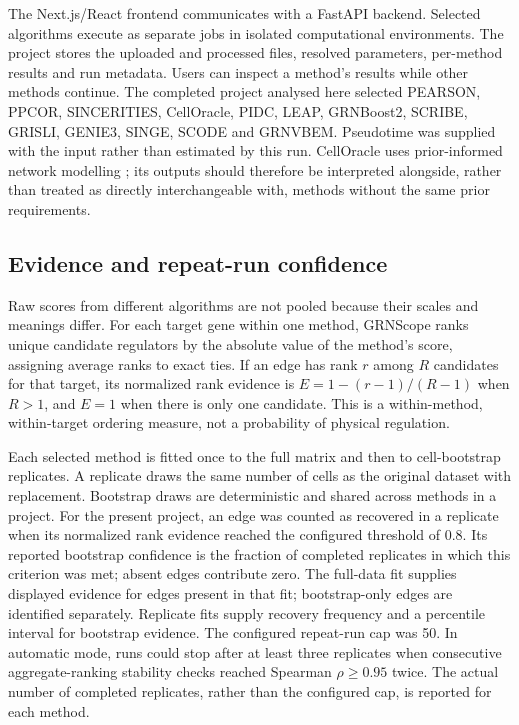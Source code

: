 \documentclass[11pt]{article}
\begin{document}
The Next.js/React frontend communicates with a FastAPI backend. Selected algorithms execute as separate jobs in isolated computational environments. The project stores the uploaded and processed files, resolved parameters, per-method results and run metadata. Users can inspect a method's results while other methods continue. The completed project analysed here selected PEARSON, PPCOR, SINCERITIES, CellOracle, PIDC, LEAP, GRNBoost2, SCRIBE, GRISLI, GENIE3, SINGE, SCODE and GRNVBEM. Pseudotime was supplied with the input rather than estimated by this run. CellOracle uses prior-informed network modelling \cite{kamimoto2023}; its outputs should therefore be interpreted alongside, rather than treated as directly interchangeable with, methods without the same prior requirements.

\subsection{Evidence and repeat-run confidence}

Raw scores from different algorithms are not pooled because their scales and meanings differ. For each target gene within one method, GRNScope ranks unique candidate regulators by the absolute value of the method's score, assigning average ranks to exact ties. If an edge has rank \(r\) among \(R\) candidates for that target, its normalized rank evidence is \(E=1-(r-1)/(R-1)\) when \(R>1\), and \(E=1\) when there is only one candidate. This is a within-method, within-target ordering measure, not a probability of physical regulation.

Each selected method is fitted once to the full matrix and then to cell-bootstrap replicates. A replicate draws the same number of cells as the original dataset with replacement. Bootstrap draws are deterministic and shared across methods in a project. For the present project, an edge was counted as recovered in a replicate when its normalized rank evidence reached the configured threshold of 0.8. Its reported bootstrap confidence is the fraction of completed replicates in which this criterion was met; absent edges contribute zero. The full-data fit supplies displayed evidence for edges present in that fit; bootstrap-only edges are identified separately. Replicate fits supply recovery frequency and a percentile interval for bootstrap evidence. The configured repeat-run cap was 50. In automatic mode, runs could stop after at least three replicates when consecutive aggregate-ranking stability checks reached Spearman \(\rho\geq0.95\) twice. The actual number of completed replicates, rather than the configured cap, is reported for each method.
\end{document}
